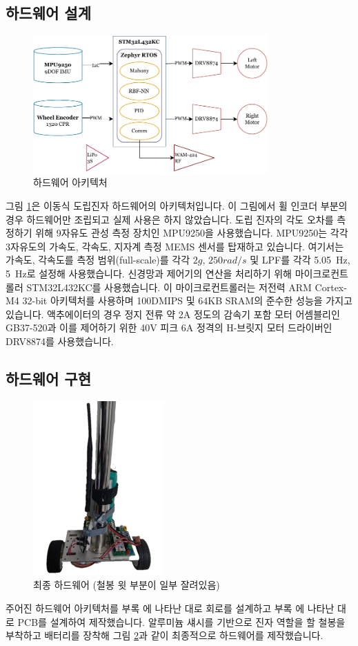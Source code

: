 \subsection{하드웨어 설계}
%
\begin{figure}[h]
    \centering
    \includegraphics[width=9cm]{figures/hw_arch.pdf}
    \caption{하드웨어 아키텍처}
    \label{fig:hardware_arch}
\end{figure}
%
그림 \ref{fig:hardware_arch}은 이동식 도립진자 하드웨어의 아키텍처입니다. 이 그림에서 휠 인코더 부분의 경우 하드웨어만 조립되고 실제 사용은 하지 않았습니다. 도립 진자의 각도 오차를 측정하기 위해 9자유도 관성 측정 장치인 MPU9250을 사용했습니다. MPU9250는 각각 3자유도의 가속도, 각속도, 지자계 측정 MEMS 센서를 탑재하고 있습니다. \cite{invensense:mpu9250} 여기서는 가속도, 각속도를 측정 범위(full-scale)를 각각 \(2g\), \(250rad/s\) 및 LPF를 각각 \SI{5.05}{\Hz}, \SI{5}{\Hz}로 설정해 사용했습니다. 신경망과 제어기의 연산을 처리하기 위해 마이크로컨트롤러 STM32L432KC를 사용했습니다. 이 마이크로컨트롤러는 저전력 ARM Cortex-M4 32-bit 아키텍처를 사용하며 100DMIPS 및 64KB SRAM의 준수한 성능을 가지고 있습니다. \cite{st:stm32l432kc} 액추에이터의 경우 정지 전류 약 2A 정도의 감속기 포함 모터 어셈블리인 GB37-520과 이를 제어하기 위한 40V 피크 6A 정격의 H-브릿지 모터 드라이버인 DRV8874를 사용했습니다. \cite{ti:drv8847}
%
\subsection{하드웨어 구현}
%
\begin{figure}[H]
    \centering
    \includegraphics[width=5cm]{figures/hw.png}
    \caption{최종 하드웨어 (철봉 윗 부분이 일부 잘려있음)}
    \label{fig:hardware}
\end{figure}
%
주어진 하드웨어 아키텍처를 부록 에 나타난 대로 회로를 설계하고 부록 에 나타난 대로 PCB를 설계하여 제작했습니다. 알루미늄 섀시를 기반으로 진자 역할을 할 철봉을 부착하고 배터리를 장착해 그림 \ref{fig:hardware}과 같이 최종적으로 하드웨어를 제작했습니다.
%
